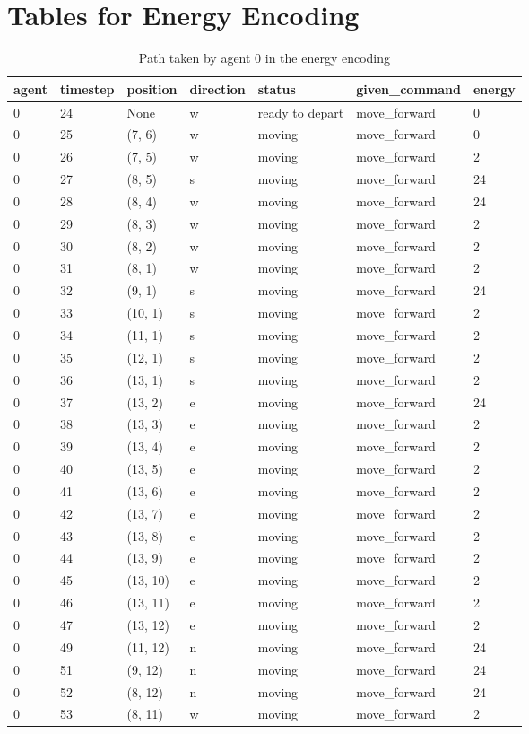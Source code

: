 \documentclass[12pt, a4paper]{llncs}
\begin{document}
\section{Tables for Energy Encoding}
\begin{table}[htbp]
  \centering
  \caption{Path taken by agent 0 in the energy encoding}
  \label{tab:energy0}
  \begin{tabular}{lllllll}
    \toprule
    agent & timestep & position & direction & status & given\_command & energy \\
    \midrule
0 & 24 & None & w & ready to depart & move\_forward & 0 \\
0 & 25 & (7, 6) & w & moving & move\_forward & 0 \\
0 & 26 & (7, 5) & w & moving & move\_forward & 2 \\
0 & 27 & (8, 5) & s & moving & move\_forward & 24 \\
0 & 28 & (8, 4) & w & moving & move\_forward & 24 \\
0 & 29 & (8, 3) & w & moving & move\_forward & 2 \\
0 & 30 & (8, 2) & w & moving & move\_forward & 2 \\
0 & 31 & (8, 1) & w & moving & move\_forward & 2 \\
0 & 32 & (9, 1) & s & moving & move\_forward & 24 \\
0 & 33 & (10, 1) & s & moving & move\_forward	 & 2 \\
0 & 34 & (11, 1) & s & moving & move\_forward	 & 2 \\
0 & 35 & (12, 1) & s & moving & move\_forward	 & 2 \\
0 & 36 & (13, 1) & s & moving & move\_forward	 & 2 \\
0 & 37 & (13, 2) & e & moving & move\_forward & 24 \\
0 & 38 & (13, 3) & e & moving & move\_forward & 2 \\
0 & 39 & (13, 4) & e & moving & move\_forward & 2 \\
0 & 40 & (13, 5) & e & moving & move\_forward & 2 \\
0 & 41 & (13, 6) & e & moving & move\_forward & 2 \\
0 & 42 & (13, 7) & e & moving & move\_forward & 2 \\
0 & 43 & (13, 8) & e & moving & move\_forward & 2 \\
0 & 44 & (13, 9)	 & e & moving & move\_forward & 2 \\
0 & 45 & (13, 10) & e & moving & move\_forward & 2 \\
0 & 46 & (13, 11) & e	 & moving & move\_forward & 2 \\
0 & 47 & (13, 12) & e	 & moving & move\_forward & 2 \\
0 & 49 & (11, 12) & n	 & moving & move\_forward & 24 \\
0 & 51 & (9, 12)	 & n & moving & move\_forward & 24 \\
0 & 52 & (8, 12)	 & n & moving & move\_forward & 24 \\
0 & 53 & (8, 11)	 & w & moving & move\_forward & 2 \\
    \bottomrule
  \end{tabular}
\end{table}
\end{document}
